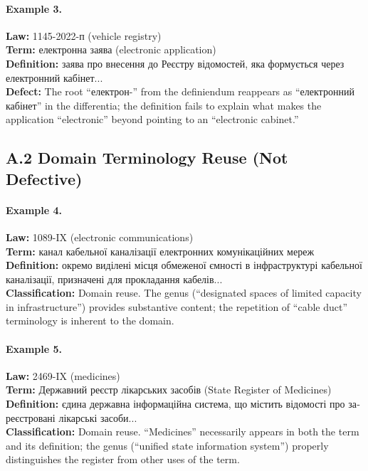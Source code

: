 \documentclass[11pt]{article}
\begin{document}
\paragraph{Example 3.}
\textbf{Law:} 1145-2022-\foreignlanguage{ukrainian}{п} (vehicle registry) \\
\textbf{Term:} \foreignlanguage{ukrainian}{електронна заява} (electronic application) \\
\textbf{Definition:} \foreignlanguage{ukrainian}{заява про внесення до Реєстру відомостей, яка формується через електронний кабінет...} \\
\textbf{Defect:} The root \foreignlanguage{ukrainian}{``електрон-''} from the definiendum reappears as \foreignlanguage{ukrainian}{``електронний кабінет''} in the differentia; the definition fails to explain what makes the application ``electronic'' beyond pointing to an ``electronic cabinet.''

\subsection*{A.2 Domain Terminology Reuse (Not Defective)}

\paragraph{Example 4.}
\textbf{Law:} 1089-IX (electronic communications) \\
\textbf{Term:} \foreignlanguage{ukrainian}{канал кабельної каналізації електронних комунікаційних мереж} \\
\textbf{Definition:} \foreignlanguage{ukrainian}{окремо виділені місця обмеженої ємності в інфраструктурі кабельної каналізації, призначені для прокладання кабелів...} \\
\textbf{Classification:} Domain reuse. The genus (``designated spaces of limited capacity in infrastructure'') provides substantive content; the repetition of ``cable duct'' terminology is inherent to the domain.

\paragraph{Example 5.}
\textbf{Law:} 2469-IX (medicines) \\
\textbf{Term:} \foreignlanguage{ukrainian}{Державний реєстр лікарських засобів} (State Register of Medicines) \\
\textbf{Definition:} \foreignlanguage{ukrainian}{єдина державна інформаційна система, що містить відомості про зареєстровані лікарські засоби...} \\
\textbf{Classification:} Domain reuse. ``Medicines'' necessarily appears in both the term and its definition; the genus (``unified state information system'') properly distinguishes the register from other uses of the term.
\end{document}
